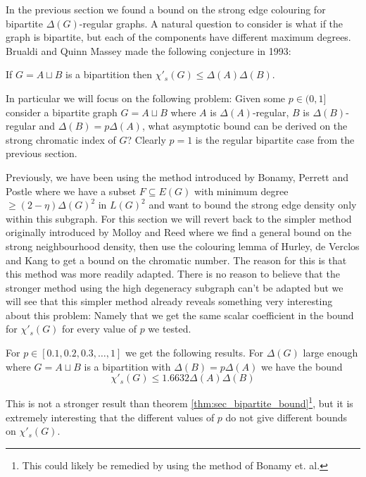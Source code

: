 In the previous section we found a bound on the strong edge colouring for bipartite
$\Delta(G)$-regular graphs. A natural question to consider is what if the graph
is bipartite, but each of the components have different maximum degrees.
Brualdi and Quinn Massey made the following conjecture
in 1993:

\begin{knownconjecture}
    If $G=A \sqcup B$ is a bipartition then
    $\chi'_s(G) \leq \Delta(A)\Delta(B)$.
\end{knownconjecture}

In particular we will focus on the following problem: Given some
$p\in (0, 1]$ consider a bipartite graph
$G=A \sqcup B$ where $A$ is $\Delta(A)$-regular, $B$ is $\Delta(B)$-regular
and $\Delta(B) = p\Delta(A)$, what asymptotic bound can be derived on the strong chromatic
index of $G$? Clearly $p=1$ is the regular bipartite case from the previous section.

Previously, we have been using the method introduced by Bonamy, Perrett and Postle
\cite{bonamyColouringGraphsSparse2018} where we have a subset $F\subseteq E(G)$ 
with minimum degree $\geq (2-\eta)\Delta(G)^2$ in $L(G)^2$ and want to bound the
strong edge density only within this subgraph. For this section we will revert back
to the simpler method originally introduced by Molloy and Reed
\cite{molloyBoundStrongChromatic1997} where we find a general bound on the strong
neighbourhood density, then use the colouring lemma of Hurley, de Verclos and Kang
\cite{hurleyImprovedProcedureColouring2022} to get a bound on the chromatic number.
The reason for this is that this method was more readily adapted. There is no reason
to believe that the stronger method using the high degeneracy subgraph can't be adapted
but we will see that this simpler method already reveals something very interesting about this
problem: Namely that we get the same scalar coefficient in the bound for 
$\chi'_s(G)$ for every value of $p$ we tested.

\begin{theorem}
    \label{thm:asymmetric_bipartite_bound}
    For $p\in [0.1, 0.2, 0.3, \dots, 1]$ we get the following results.
    For $\Delta(G)$ large enough where $G=A\sqcup B$ is a bipartition with
    $\Delta(B)=p\Delta(A)$ we have the bound
    \[
        \chi'_s(G) \leq 1.6632 \Delta(A)\Delta(B)
    \]
\end{theorem}

This is not a stronger result than theorem \ref{thm:sec_bipartite_bound}\footnote{This could likely
be remedied by using the method of Bonamy et. al.},
but it is extremely interesting that the different values of $p$ do not give different bounds on
$\chi'_s(G)$.

